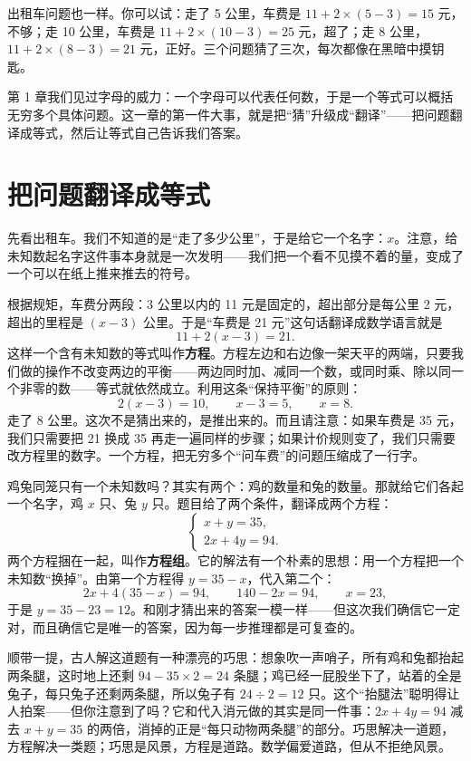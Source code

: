 出租车问题也一样。你可以试：走了 5 公里，车费是 $11 + 2 \times (5-3) = 15$ 元，不够；走 10 公里，车费是 $11 + 2 \times (10-3) = 25$ 元，超了；走 8 公里，$11 + 2 \times (8-3) = 21$ 元，正好。三个问题猜了三次，每次都像在黑暗中摸钥匙。

第 1 章我们见过字母的威力：一个字母可以代表任何数，于是一个等式可以概括无穷多个具体问题。这一章的第一件大事，就是把“猜”升级成“翻译”——把问题翻译成等式，然后让等式自己告诉我们答案。

\section{把问题翻译成等式}

先看出租车。我们不知道的是“走了多少公里”，于是给它一个名字：$x$。注意，给未知数起名字这件事本身就是一次发明——我们把一个看不见摸不着的量，变成了一个可以在纸上推来推去的符号。

根据规矩，车费分两段：3 公里以内的 11 元是固定的，超出部分是每公里 2 元，超出的里程是 $(x - 3)$ 公里。于是“车费是 21 元”这句话翻译成数学语言就是
\[
11 + 2(x - 3) = 21.
\]
这样一个含有未知数的等式叫作\textbf{方程}。方程左边和右边像一架天平的两端，只要我们做的操作不改变两边的平衡——两边同时加、减同一个数，或同时乘、除以同一个非零的数——等式就依然成立。利用这条“保持平衡”的原则：
\[
2(x - 3) = 10,\qquad x - 3 = 5,\qquad x = 8.
\]
走了 8 公里。这次不是猜出来的，是推出来的。而且请注意：如果车费是 35 元，我们只需要把 21 换成 35 再走一遍同样的步骤；如果计价规则变了，我们只需要改方程里的数字。一个方程，把无穷多个“问车费”的问题压缩成了一行字。

鸡兔同笼只有一个未知数吗？其实有两个：鸡的数量和兔的数量。那就给它们各起一个名字，鸡 $x$ 只、兔 $y$ 只。题目给了两个条件，翻译成两个方程：
\[
\begin{cases}
x + y = 35,\\
2x + 4y = 94.
\end{cases}
\]
两个方程捆在一起，叫作\textbf{方程组}。它的解法有一个朴素的思想：用一个方程把一个未知数“换掉”。由第一个方程得 $y = 35 - x$，代入第二个：
\[
2x + 4(35 - x) = 94,\qquad 140 - 2x = 94,\qquad x = 23,
\]
于是 $y = 35 - 23 = 12$。和刚才猜出来的答案一模一样——但这次我们确信它一定对，而且确信它是唯一的答案，因为每一步推理都是可复查的。

顺带一提，古人解这道题有一种漂亮的巧思：想象吹一声哨子，所有鸡和兔都抬起两条腿，这时地上还剩 $94 - 35 \times 2 = 24$ 条腿；鸡已经一屁股坐下了，站着的全是兔子，每只兔子还剩两条腿，所以兔子有 $24 \div 2 = 12$ 只。这个“抬腿法”聪明得让人拍案——但你注意到了吗？它和代入消元做的其实是同一件事：$2x + 4y = 94$ 减去 $x + y = 35$ 的两倍，消掉的正是“每只动物两条腿”的部分。巧思解决一道题，方程解决一类题；巧思是风景，方程是道路。数学偏爱道路，但从不拒绝风景。

